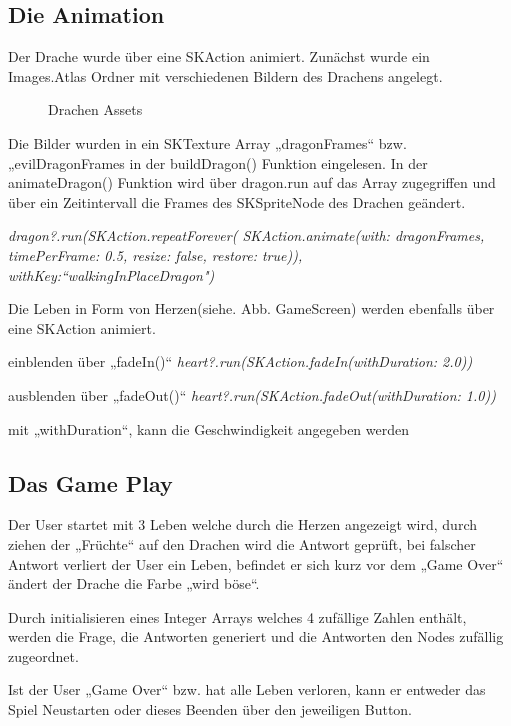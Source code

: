 \subsection{Die Animation}

Der Drache wurde über eine SKAction animiert. Zunächst wurde ein Images.Atlas Ordner mit verschiedenen Bildern des Drachens angelegt.

\begin{figure}[H]
	\centering
	\caption{Drachen Assets}
	\label{Drachen Assets}
\end{figure}

Die Bilder wurden in ein SKTexture Array „dragonFrames“ bzw. „evilDragonFrames in der buildDragon() Funktion eingelesen. 
In der animateDragon() Funktion wird über dragon.run auf das Array zugegriffen und über ein Zeitintervall die Frames des SKSpriteNode des Drachen geändert.

	\textit{dragon?.run(SKAction.repeatForever(
                	SKAction.animate(with: dragonFrames,
                                 	timePerFrame: 0.5,
                                	 resize: false,
                                	 restore: true)),
                       	 withKey:“walkingInPlaceDragon")}
                        
                        

Die Leben in Form von Herzen(siehe. Abb. GameScreen) werden ebenfalls über eine SKAction animiert.

	einblenden über „fadeIn()“
	\textit{heart?.run(SKAction.fadeIn(withDuration: 2.0))}
	
	ausblenden über „fadeOut()“
	\textit{heart?.run(SKAction.fadeOut(withDuration: 1.0))}
	
	mit „withDuration“, kann die Geschwindigkeit angegeben werden
	
	

\subsection{Das Game Play}

Der User startet mit 3 Leben welche durch die Herzen angezeigt wird, durch ziehen der „Früchte“ auf den Drachen wird die Antwort geprüft, bei falscher Antwort verliert der User ein Leben, befindet er sich kurz vor dem „Game Over“ ändert der Drache die Farbe „wird böse“.

Durch initialisieren eines Integer Arrays welches 4 zufällige Zahlen enthält, werden die Frage, die Antworten generiert und die Antworten den Nodes zufällig zugeordnet.

Ist der User „Game Over“ bzw. hat alle Leben verloren, kann er entweder das Spiel Neustarten oder dieses Beenden über den jeweiligen Button.


